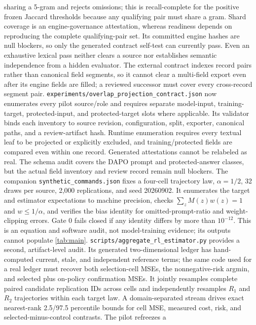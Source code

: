 \documentclass{article}
\begin{document}
sharing a 5-gram and rejects omissions; this is recall-complete for the
positive frozen Jaccard thresholds because any qualifying pair must share a
gram. Shard coverage is an engine-governance attestation, whereas readiness
depends on reproducing the complete qualifying-pair set. Its committed engine
hashes are null blockers, so only the generated contract self-test can
currently pass. Even an exhaustive lexical pass neither clears a source nor
establishes semantic independence from a hidden evaluator.
The external contract indexes record pairs rather than canonical field
segments, so it cannot clear a multi-field export even after its engine fields
are filled; a reviewed successor must cover every cross-record segment pair.
\texttt{experiments/overlap\_projection\_contract.json} now enumerates every
pilot source/role and requires separate model-input, training-target,
protected-input, and protected-target slots where applicable. Its validator
binds each inventory to source revision, configuration, split, exporter,
canonical paths, and a review-artifact hash. Runtime enumeration requires
every textual leaf to be projected or explicitly excluded, and
training/protected fields are compared even within one record. Generated
attestations cannot be relabeled as real. The schema audit covers the DAPO prompt and protected-answer classes,
but the actual field inventory and review record remain null blockers.
The companion \texttt{synthetic\_commands.json} fixes a four-cell trajectory
law, $\alpha=1/2$, 32 draws per source, 2,000 replications, and seed 20260902.
It enumerates the target and estimator expectations to machine precision,
checks $\sum_zM(z)w(z)=1$ and $w\le1/\alpha$, and verifies the bias identity
for omitted-prompt-ratio and weight-clipping errors. Gate 0 fails closed if any
identity differs by more than $10^{-12}$. This is an equation and software
audit, not model-training evidence; its outputs cannot populate
\cref{tab:main}.
\texttt{scripts/aggregate\_rl\_estimator.py} provides a second, artifact-level
audit. Its generated two-dimensional ledger has hand-computed current, stale,
and independent reference terms; the same code used for a real ledger must
recover both selection-cell MSEs, the nonnegative-risk argmin, and selected
plus on-policy confirmation MSEs. It jointly resamples complete paired
candidate replication IDs across cells and independently resamples $R_1$ and
$R_2$ trajectories within each target law. A domain-separated stream drives
exact nearest-rank 2.5/97.5 percentile bounds for cell MSE, measured cost,
risk, and selected-minus-control contrasts. The pilot refreezes a
\end{document}
